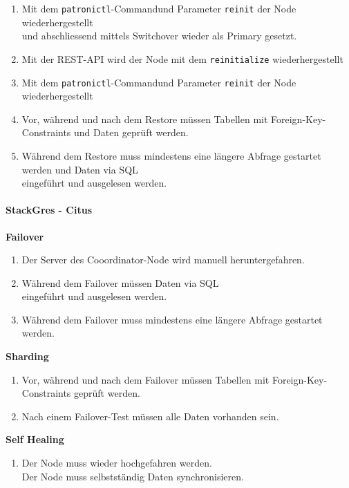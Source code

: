 \begin{flushleft}
\begin{description}
\begin{enumerate}[resume]
            \item Mit dem \texttt{patronictl}-Commandund Parameter \texttt{reinit} der Node wiederhergestellt\\und abschliessend mittels Switchover wieder als Primary gesetzt.
            \item Mit der REST-API wird der Node mit dem \texttt{reinitialize} wiederhergestellt
            \item Mit dem \texttt{patronictl}-Commandund Parameter \texttt{reinit} der Node wiederhergestellt
            \item Vor, während und nach dem Restore müssen Tabellen mit Foreign-Key-Constraints und Daten geprüft werden.
            \item Während dem Restore muss mindestens eine längere Abfrage gestartet werden und Daten via SQL\\eingeführt und ausgelesen werden.
        \end{enumerate}
    \end{description}
    \paragraph{StackGres - Citus}
    \begin{description}
        \item \textbf{Failover}\hfill \\
        \begin{enumerate}
            \item Der Server des Cooordinator-Node wird manuell heruntergefahren.
            \item Während dem Failover müssen Daten via SQL\\eingeführt und ausgelesen werden.
            \item Während dem Failover muss mindestens eine längere Abfrage gestartet werden.
        \end{enumerate}
        \item \textbf{Sharding}\hfill \\
        \begin{enumerate}[resume]
            \item Vor, während und nach dem Failover müssen Tabellen mit Foreign-Key-Constraints geprüft werden.
            \item Nach einem Failover-Test müssen alle Daten vorhanden sein.
        \end{enumerate}
        \item \textbf{Self Healing}\hfill \\
        \begin{enumerate}[resume]
            \item Der Node muss wieder hochgefahren werden.\\Der Node muss selbstständig Daten synchronisieren.
        \end{enumerate}
    \end{description}

\end{flushleft}
